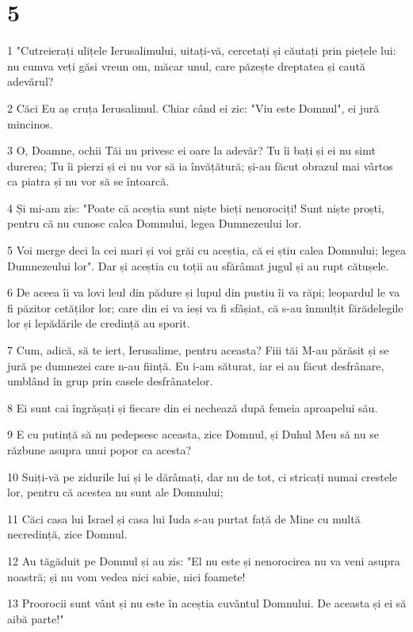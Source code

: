 \chapter{5}

\par 1 "Cutreierați ulițele Ierusalimului, uitați-vă, cercetați și căutați prin piețele lui: nu cumva veți găsi vreun om, măcar unul, care păzește dreptatea și caută adevărul?
\par 2 Căci Eu aș cruța Ierusalimul. Chiar când ei zic: "Viu este Domnul", ei jură mincinos.
\par 3 O, Doamne, ochii Tăi nu privesc ei oare la adevăr? Tu îi bați și ei nu simt durerea; Tu îi pierzi și ei nu vor să ia învățătură; și-au făcut obrazul mai vârtos ca piatra și nu vor să se întoarcă.
\par 4 Și mi-am zis: "Poate că aceștia sunt niște bieți nenorociți! Sunt niște proști, pentru că nu cunosc calea Domnului, legea Dumnezeului lor.
\par 5 Voi merge deci la cei mari și voi grăi cu aceștia, că ei știu calea Domnului; legea Dumnezeului lor". Dar și aceștia cu toții au sfărâmat jugul și au rupt cătușele.
\par 6 De aceea îi va lovi leul din pădure și lupul din pustiu îi va răpi; leopardul le va fi păzitor cetăților lor; care din ei va ieși va fi sfâșiat, că s-au înmulțit fărădelegile lor și lepădările de credință au sporit.
\par 7 Cum, adică, să te iert, Ierusalime, pentru aceasta? Fiii tăi M-au părăsit și se jură pe dumnezei care n-au ființă. Eu i-am săturat, iar ei au făcut desfrânare, umblând în grup prin casele desfrânatelor.
\par 8 Ei sunt cai îngrășați și fiecare din ei nechează după femeia aproapelui său.
\par 9 E cu putință să nu pedepsesc aceasta, zice Domnul, și Duhul Meu să nu se răzbune asupra unui popor ca acesta?
\par 10 Suiți-vă pe zidurile lui și le dărâmați, dar nu de tot, ci stricați numai crestele lor, pentru că acestea nu sunt ale Domnului;
\par 11 Căci casa lui Israel și casa lui Iuda s-au purtat față de Mine cu multă necredință, zice Domnul.
\par 12 Au tăgăduit pe Domnul și au zis: "El nu este și nenorocirea nu va veni asupra noastră; și nu vom vedea nici sabie, nici foamete!
\par 13 Proorocii sunt vânt și nu este în aceștia cuvântul Domnului. De aceasta și ei să aibă parte!"
